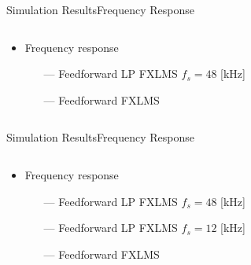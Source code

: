 \begin{frame}{Simulation Results}{Frequency Response}		
\begin{columns}
	\begin{column}{0.4\textwidth}
		\begin{itemize}
			\item Frequency response
			\begin{itemize}
				\item[\textcolor{MATLABorange}{---}] Feedforward LP FXLMS $f_s= 48$ [kHz]  
				\item[\textcolor{MATLABblue}{---}] Feedforward FXLMS 
			\end{itemize}
		\end{itemize}
	\end{column}
	\begin{column}{0.6\textwidth} 
		\resizebox{0.9\columnwidth}{!}{		
			}
	\end{column}
\end{columns}
\end{frame}


\begin{frame}{Simulation Results}{Frequency Response}		
\begin{columns}
	\begin{column}{0.4\textwidth}
		\begin{itemize}
			\item Frequency response
			\begin{itemize}
				\item[\textcolor{MATLABorange}{---}] Feedforward LP FXLMS $f_s= 48$ [kHz]
				\item[\textcolor{MATLABblue}{---}] Feedforward LP FXLMS $f_s= 12$ [kHz]  
				\item[\textcolor{MATLABblue}{---}] Feedforward FXLMS  
			\end{itemize}
		\end{itemize}
	\end{column}
	\begin{column}{0.6\textwidth} 
		\resizebox{0.9\columnwidth}{!}{		
			}
	\end{column}
\end{columns}
\end{frame}




